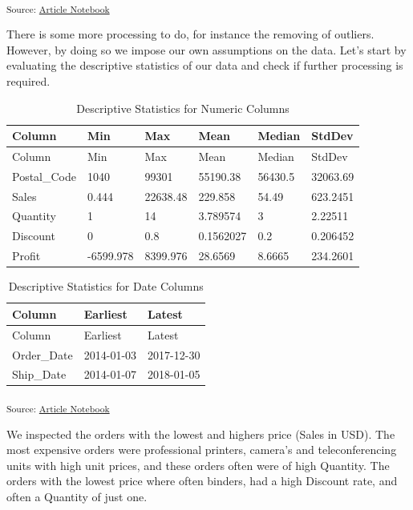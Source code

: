 \documentclass[
]{agujournal2019}
\begin{document}
\textsubscript{Source:
\href{https://SJbrou.github.io/Supply_Chain_Data_Analysis/index.qmd.html}{Article
Notebook}}

There is some more processing to do, for instance the removing of
outliers. However, by doing so we impose our own assumptions on the
data. Let's start by evaluating the descriptive statistics of our data
and check if further processing is required.

\begin{longtable}[]{@{}llllll@{}}
\caption{Descriptive Statistics for Numeric Columns}\tabularnewline
\toprule\noalign{}
Column & Min & Max & Mean & Median & StdDev \\
\midrule\noalign{}
\endfirsthead
\toprule\noalign{}
Column & Min & Max & Mean & Median & StdDev \\
\midrule\noalign{}
\endhead
\bottomrule\noalign{}
\endlastfoot
Postal\_Code & 1040 & 99301 & 55190.38 & 56430.5 & 32063.69 \\
Sales & 0.444 & 22638.48 & 229.858 & 54.49 & 623.2451 \\
Quantity & 1 & 14 & 3.789574 & 3 & 2.22511 \\
Discount & 0 & 0.8 & 0.1562027 & 0.2 & 0.206452 \\
Profit & -6599.978 & 8399.976 & 28.6569 & 8.6665 & 234.2601 \\
\end{longtable}

\begin{longtable}[]{@{}lll@{}}
\caption{Descriptive Statistics for Date Columns}\tabularnewline
\toprule\noalign{}
Column & Earliest & Latest \\
\midrule\noalign{}
\endfirsthead
\toprule\noalign{}
Column & Earliest & Latest \\
\midrule\noalign{}
\endhead
\bottomrule\noalign{}
\endlastfoot
Order\_Date & 2014-01-03 & 2017-12-30 \\
Ship\_Date & 2014-01-07 & 2018-01-05 \\
\end{longtable}

\textsubscript{Source:
\href{https://SJbrou.github.io/Supply_Chain_Data_Analysis/index.qmd.html}{Article
Notebook}}

We inspected the orders with the lowest and highers price (Sales in
USD). The most expensive orders were professional printers, camera's and
teleconferencing units with high unit prices, and these orders often
were of high Quantity. The orders with the lowest price where often
binders, had a high Discount rate, and often a Quantity of just one.
\end{document}
